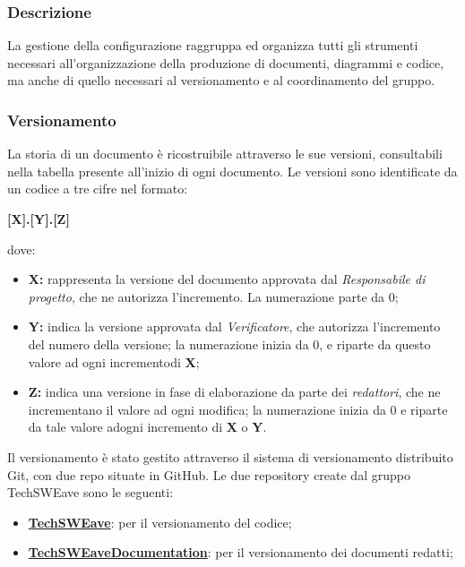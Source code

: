         \subsubsection{Descrizione}
        La gestione della configurazione raggruppa ed organizza tutti gli strumenti necessari all'organizzazione della produzione di documenti, diagrammi e codice, ma anche di quello necessari al versionamento e al coordinamento del gruppo.
        \subsubsection{Versionamento}
        La storia di un documento è ricostruibile attraverso le sue versioni, consultabili nella tabella presente all'inizio di ogni documento. Le versioni sono identificate da un codice a tre cifre nel formato: 
        \begin{center}
            \textbf{\large [X].[Y].[Z]}\\             
        \end{center}
        dove: 
        \begin{itemize}
            \item \textbf{\large X:} rappresenta la versione del documento approvata dal \textit{Responsabile di progetto}, che ne autorizza l'incremento. La numerazione parte da 0;
            \item \textbf{\large Y:} indica la versione approvata dal \textit{Verificatore}, che autorizza l’incremento del numero della versione; la numerazione inizia da 0, e riparte da questo valore ad ogni incrementodi \textbf{X};
            \item \textbf{\large Z:} indica una versione in fase di elaborazione da parte dei \textit{redattori}, che ne incrementano il valore ad ogni modifica; la numerazione inizia da 0 e riparte da tale valore adogni incremento di \textbf{X} o \textbf{Y}.
        \end{itemize}
        Il versionamento è stato gestito attraverso il sistema di versionamento distribuito Git, con due repo situate in GitHub.
        Le due repository create dal gruppo TechSWEave sono le seguenti:
        \begin{itemize}
            \item \textbf{\href{https://github.com/techsweave/TechSWEave.git}{TechSWEave}}: per il versionamento del codice;
            \item \textbf{\href{https://github.com/techsweave/TechSWEaveDocumentation.git}{TechSWEaveDocumentation}}: per il versionamento dei documenti redatti;
        \end{itemize}
